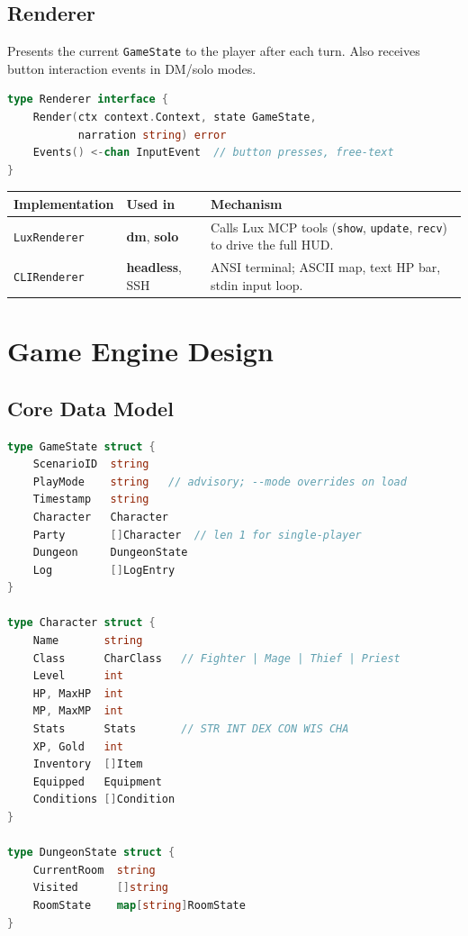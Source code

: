 \documentclass[a4paper,10pt]{article}
\newcommand{\tool}[1]{\texttt{#1}}
\newcommand{\mode}[1]{\textbf{#1}}
\begin{document}
\subsection{Renderer}

Presents the current \texttt{GameState} to the player after each
turn.  Also receives button interaction events in DM/solo modes.

\begin{lstlisting}[language=Go]
type Renderer interface {
    Render(ctx context.Context, state GameState,
           narration string) error
    Events() <-chan InputEvent  // button presses, free-text
}
\end{lstlisting}

\begin{center}
\begin{tabular}{lll}
\toprule
\textbf{Implementation} & \textbf{Used in} & \textbf{Mechanism} \\
\midrule
\texttt{LuxRenderer}
  & \mode{dm}, \mode{solo}
  & Calls Lux MCP tools (\tool{show}, \tool{update}, \tool{recv})
    to drive the full HUD. \\
\texttt{CLIRenderer}
  & \mode{headless}, SSH
  & ANSI terminal; ASCII map, text HP bar, stdin input loop. \\
\bottomrule
\end{tabular}
\end{center}

\section{Game Engine Design}
\label{sec:engine}

\subsection{Core Data Model}

\begin{lstlisting}[language=Go]
type GameState struct {
    ScenarioID  string
    PlayMode    string   // advisory; --mode overrides on load
    Timestamp   string
    Character   Character
    Party       []Character  // len 1 for single-player
    Dungeon     DungeonState
    Log         []LogEntry
}

type Character struct {
    Name       string
    Class      CharClass   // Fighter | Mage | Thief | Priest
    Level      int
    HP, MaxHP  int
    MP, MaxMP  int
    Stats      Stats       // STR INT DEX CON WIS CHA
    XP, Gold   int
    Inventory  []Item
    Equipped   Equipment
    Conditions []Condition
}

type DungeonState struct {
    CurrentRoom  string
    Visited      []string
    RoomState    map[string]RoomState
}
\end{lstlisting}
\end{document}
